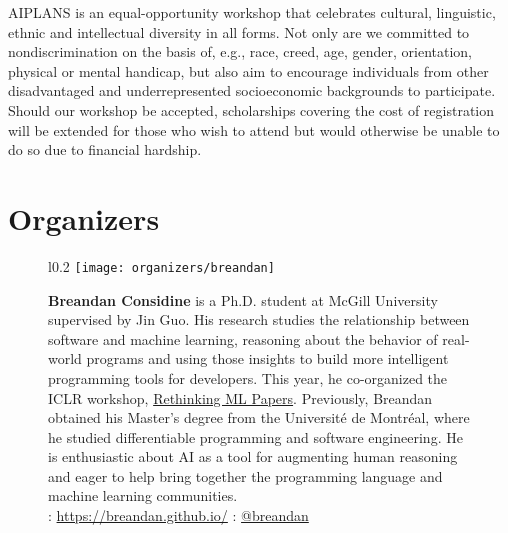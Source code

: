 \documentclass{article}
\begin{document}
    AIPLANS is an equal-opportunity workshop that celebrates cultural, linguistic, ethnic and intellectual diversity in all forms. Not only are we committed to nondiscrimination on the basis of, e.g., race, creed, age, gender, orientation, physical or mental handicap, but also aim to encourage individuals from other disadvantaged and underrepresented socioeconomic backgrounds to participate. Should our workshop be accepted, scholarships covering the cost of registration will be extended for those who wish to attend but would otherwise be unable to do so due to financial hardship.


    \newpage


    \section*{Organizers}\vspace{-0.5cm}
    \begin{figure}[H]
        \begin{wrapfigure}{l}{0.2\textwidth}
            \texttt{[image: organizers/breandan]}
        \end{wrapfigure}
        \textbf{Breandan Considine} is a Ph.D. student at McGill University supervised by Jin Guo. His research studies the relationship between software and machine learning, reasoning about the behavior of real-world programs and using those insights to build more intelligent programming tools for developers. This year, he co-organized the ICLR workshop, \href{https://rethinkingmlpapers.github.io/}{Rethinking ML Papers}. Previously, Breandan obtained his Master's degree from the Universit\'e de Montr\'eal, where he studied differentiable programming and software engineering. He is enthusiastic about AI as a tool for augmenting human reasoning and eager to help bring together the programming language and machine learning communities.\\
        \faHome: \url{https://breandan.github.io/} \faTwitter: \href{https://twitter.com/breandan}{@breandan}
    \end{figure}
\end{document}
